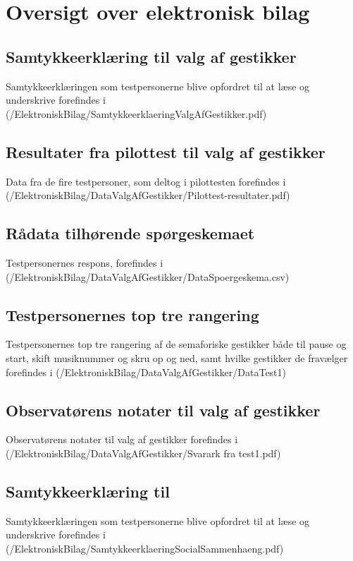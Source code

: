 \chapter{Oversigt over elektronisk bilag}
\label{app:OversigtOverElektroniskBilag}
%
%
\section{Samtykkeerklæring til valg af gestikker}
\label{app:SamtykkeerklaeringValgAfGestikker}
%
Samtykkeerklæringen som testpersonerne blive opfordret til at læse og underskrive forefindes i (/ElektroniskBilag/SamtykkeerklaeringValgAfGestikker.pdf)
%
\section{Resultater fra pilottest til valg af gestikker}
\label{app:ResultaterPilottestValgAfGestikker}
%
Data fra de fire testpersoner, som deltog i pilottesten forefindes i \\
(/ElektroniskBilag/DataValgAfGestikker/Pilottest-resultater.pdf)
%
\section{Rådata tilhørende spørgeskemaet}
\label{app:RaaDataSpoergeskema}
%
Testpersonernes respons, forefindes i (/ElektroniskBilag/DataValgAfGestikker/DataSpoergeskema.csv)
%
\section{Testpersonernes top tre rangering}
\label{app:TestpersonernesTopTre}
%
Testpersonernes top tre rangering af de semaforiske gestikker både til pause og start, skift musiknummer og skru op og ned, samt hvilke gestikker de fravælger forefindes i (/ElektroniskBilag/DataValgAfGestikker/DataTest1)
%
\section{Observatørens notater til valg af gestikker}
\label{app:NoterValgAfGestikker}
%
Observatørens notater til valg af gestikker forefindes i (/ElektroniskBilag/DataValgAfGestikker/Svarark fra test1.pdf)
%
\section{Samtykkeerklæring til }
\label{app:Samtykkeerklaering}
%
Samtykkeerklæringen som testpersonerne blive opfordret til at læse og underskrive forefindes i (/ElektroniskBilag/SamtykkeerklaeringSocialSammenhaeng.pdf)
%
